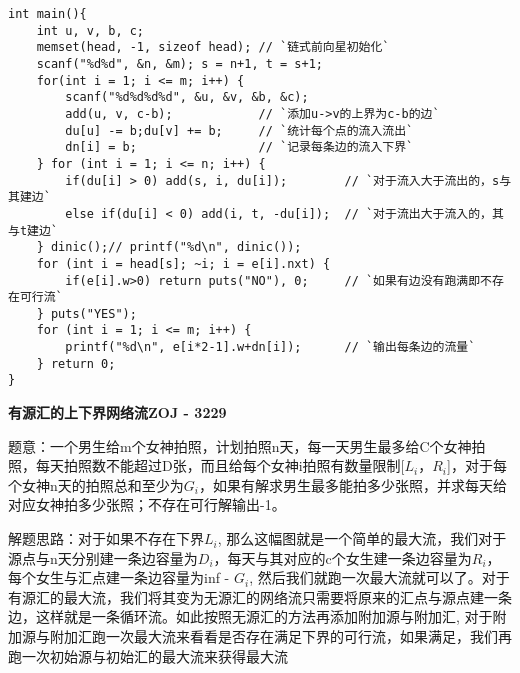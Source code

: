 \begin{lstlisting}
int main(){
    int u, v, b, c;
    memset(head, -1, sizeof head); // `链式前向星初始化`
    scanf("%d%d", &n, &m); s = n+1, t = s+1;
    for(int i = 1; i <= m; i++) {
        scanf("%d%d%d%d", &u, &v, &b, &c);
        add(u, v, c-b);            // `添加u->v的上界为c-b的边`
        du[u] -= b;du[v] += b;     // `统计每个点的流入流出`
        dn[i] = b;                 // `记录每条边的流入下界`
    } for (int i = 1; i <= n; i++) {
        if(du[i] > 0) add(s, i, du[i]);        // `对于流入大于流出的，s与其建边`
        else if(du[i] < 0) add(i, t, -du[i]);  // `对于流出大于流入的，其与t建边`
    } dinic();// printf("%d\n", dinic());
    for (int i = head[s]; ~i; i = e[i].nxt) {
        if(e[i].w>0) return puts("NO"), 0;     // `如果有边没有跑满即不存在可行流`
    } puts("YES");
    for (int i = 1; i <= m; i++) {
        printf("%d\n", e[i*2-1].w+dn[i]);      // `输出每条边的流量`
    } return 0;
}
\end{lstlisting}

{\bfseries 有源汇的上下界网络流ZOJ - 3229}

题意：一个男生给m个女神拍照，计划拍照n天，每一天男生最多给C个女神拍照，每天拍照数不能超过D张，而且给每个女神i拍照有数量限制[$L_i，R_i$]，对于每个女神n天的拍照总和至少为$G_i$，如果有解求男生最多能拍多少张照，并求每天给对应女神拍多少张照；不存在可行解输出-1。

解题思路：对于如果不存在下界$L_i$, 那么这幅图就是一个简单的最大流，我们对于源点与n天分别建一条边容量为$D_i$，每天与其对应的c个女生建一条边容量为$R_i$，每个女生与汇点建一条边容量为inf - $G_i$, 然后我们就跑一次最大流就可以了。对于有源汇的最大流，我们将其变为无源汇的网络流只需要将原来的汇点与源点建一条边，这样就是一条循环流。如此按照无源汇的方法再添加附加源与附加汇, 对于附加源与附加汇跑一次最大流来看看是否存在满足下界的可行流，如果满足，我们再跑一次初始源与初始汇的最大流来获得最大流


